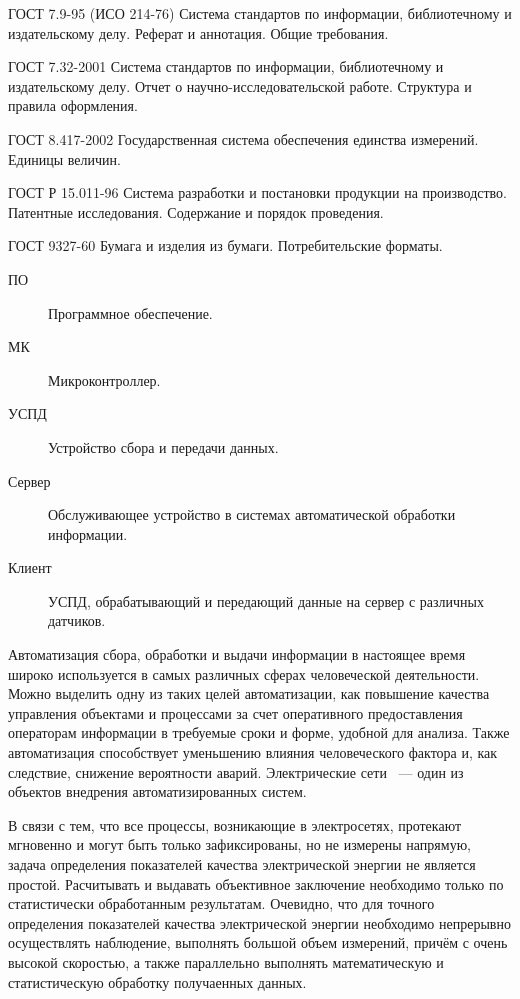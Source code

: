 \documentclass[utf8,14pt, coursreport]{G7-32}
\begin{document}
ГОСТ 7.9-95 (ИСО 214-76) Система стандартов по информации, библиотечному и издательскому делу. Реферат и аннотация. Общие требования.

ГОСТ 7.32-2001 Система стандартов по информации, библиотечному и издательскому делу. Отчет о научно-исследовательской работе. Структура и правила оформления.

ГОСТ 8.417-2002 Государственная система обеспечения единства измерений. Единицы величин.

ГОСТ Р 15.011-96 Система разработки и постановки продукции на производство. Патентные исследования. Содержание и порядок проведения.

ГОСТ 9327-60 Бумага и изделия из бумаги. Потребительские форматы.
\fi


\Abbreviations

\begin{description}
\item[ПО] Программное обеспечение.
\item[МК] Микроконтроллер.
\item[УСПД] Устройство сбора и передачи данных.
\item[Сервер] Обслуживающее устройство в системах автоматической обработки информации.
\item[Клиент] УСПД, обрабатывающий и передающий данные на сервер с различных датчиков.
\end{description}


\Introduction
Автоматизация сбора, обработки и выдачи информации в настоящее время широко используется в самых различных сферах человеческой деятельности. Можно выделить одну из таких целей автоматизации, как повышение качества управления объектами и процессами за счет оперативного предоставления операторам информации в требуемые сроки и форме, удобной для анализа. Также автоматизация способствует уменьшению влияния человеческого фактора и, как следствие, снижение вероятности аварий. Электрические сети ~--- один из объектов внедрения автоматизированных систем.

В связи с тем, что все процессы, возникающие в электросетях, протекают мгновенно и могут быть только зафиксированы, но не измерены напрямую, задача определения показателей качества электрической энергии не является простой. Расчитывать и выдавать объективное заключение необходимо только по статистически обработанным результатам. Очевидно, что для точного определения показателей качества электрической энергии необходимо непрерывно осуществлять наблюдение, выполнять большой объем измерений, причём с очень высокой скоростью, а также параллельно выполнять математическую и статистическую обработку получаенных данных.\cite{qualitymonitor}
\end{document}
